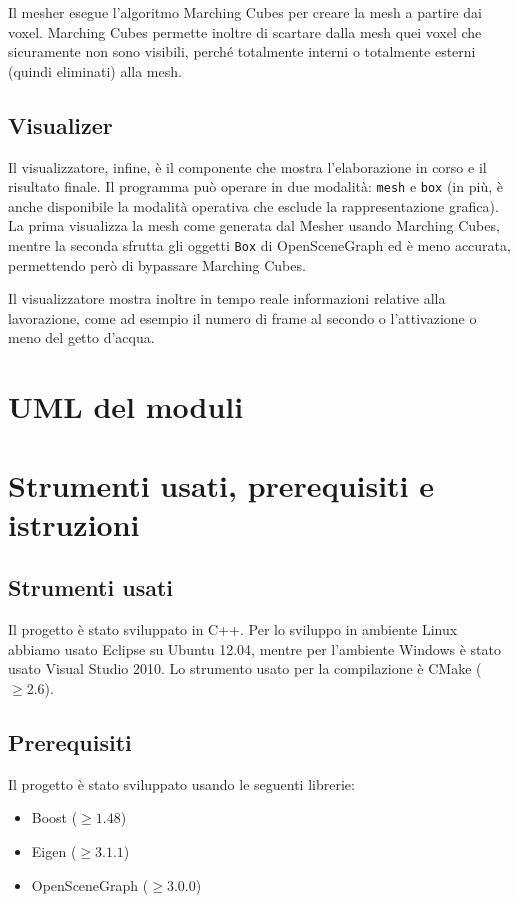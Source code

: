 \documentclass[10pt,a4paper,twoside,openright,titlepage,fleqn,%
               headinclude,,footinclude,BCOR5mm,%
               numbers=noenddot,cleardoublepage=empty,%
               tablecaptionabove]{scrreprt}
\begin{document}
Il mesher esegue l'algoritmo Marching Cubes per creare la mesh a partire dai voxel. Marching Cubes permette inoltre di scartare dalla mesh quei voxel che sicuramente non sono visibili, perché totalmente interni o totalmente esterni (quindi eliminati) alla mesh.

\subsection{Visualizer}

Il visualizzatore, infine, è il componente che mostra l'elaborazione in corso e il risultato finale. Il programma può operare in due modalità: \verb!mesh! e \verb!box! (in più, è anche disponibile la modalità operativa che esclude la rappresentazione grafica). La prima visualizza la mesh come generata dal Mesher usando Marching Cubes, mentre la seconda sfrutta gli oggetti \verb!Box! di OpenSceneGraph ed è meno accurata, permettendo però di bypassare Marching Cubes.

Il visualizzatore mostra inoltre in tempo reale informazioni relative alla lavorazione, come ad esempio il numero di frame al secondo o l'attivazione o meno del getto d'acqua.

\section{UML del moduli}

\section{Strumenti usati, prerequisiti e istruzioni}
\subsection{Strumenti usati}
Il progetto è stato sviluppato in C++. Per lo sviluppo in ambiente Linux abbiamo usato Eclipse su Ubuntu 12.04, mentre per l'ambiente Windows è stato usato Visual Studio 2010. Lo strumento usato per la compilazione è CMake ($\geq 2.6$).

\subsection{Prerequisiti}
Il progetto è stato sviluppato usando le seguenti librerie:
\begin{itemize}[noitemsep]
  \item Boost ($\geq 1.48$)
  \item Eigen ($\geq 3.1.1$)
  \item OpenSceneGraph ($\geq 3.0.0$)
\end{itemize}
\end{document}
